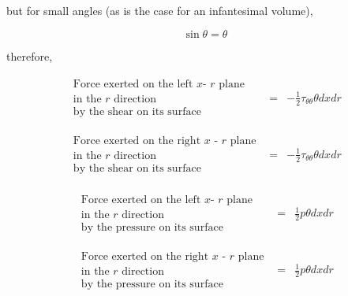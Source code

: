 	but for small angles (as is the case for an infantesimal volume),

\begin{equation}
	\sin{\theta} = \theta
\label{eqn:smallangle}
\end{equation}

	therefore,

\begin{displaymath}
	\begin{array}{ccc}
		\begin{array}{c}
		\textrm{Force exerted on the left $x$- $r$ plane} \\
		\textrm{in the $r$ direction} \\
		\textrm{by the shear on its surface}
		\end{array} & = &
		- \frac{1}{2}\tau_{\theta \theta}\theta dxdr \\
   	& \\ & \\
		\begin{array}{c}
		\textrm{Force exerted on the right $x$ - $r$ plane}\\
		\textrm{in the $r$ direction} \\
		\textrm{by the shear on its surface}
		\end{array} & = &
		- \frac{1}{2} \tau_{\theta \theta}\theta dxdr
	\end{array}
\end{displaymath}

\begin{displaymath}
	\begin{array}{ccc}
		\begin{array}{c}
		\textrm{Force exerted on the left $x$- $r$ plane} \\
		\textrm{in the $r$ direction} \\
		\textrm{by the pressure on its surface}
		\end{array} & = &
		\frac{1}{2}p \theta dxdr \\
   	& \\ & \\
		\begin{array}{c}
		\textrm{Force exerted on the right $x$ - $r$ plane}\\
		\textrm{in the $r$ direction} \\
		\textrm{by the pressure on its surface}
		\end{array} & = &
		\frac{1}{2}p \theta dxdr
	\end{array}
\end{displaymath}

